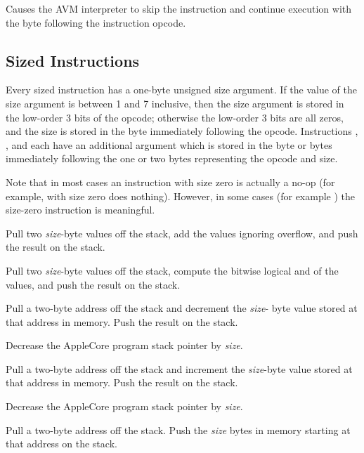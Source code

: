 \documentclass[10pt]{article}
\begin{document}
%
Causes the AVM interpreter to skip the instruction and
continue execution with the byte following the instruction
opcode.

\subsection{Sized Instructions}

Every sized instruction has a one-byte unsigned size argument.  If the
value of the size argument is between 1 and 7 inclusive, then the size
argument is stored in the low-order 3 bits of the opcode; otherwise
the low-order 3 bits are all zeros, and the size is stored in the byte
immediately following the opcode.  Instructions , ,
and  each have an additional argument which is stored in the
byte or bytes immediately following the one or two bytes representing
the opcode and size.

Note that in most cases an instruction with size zero is actually a
no-op (for example,  with size zero does nothing).  However,
in some cases (for example ) the size-zero instruction is
meaningful.

 Pull two \emph{size}-byte
values off the stack, add the values ignoring overflow, and push the
result on the stack.

 Pull two
\emph{size}-byte values off the stack, compute the bitwise logical and
of the values, and push the result on the stack.

 Pull a two-byte
address off the stack and decrement the \emph{size}- byte value stored
at that address in memory.  Push the result on the stack.

Decrease the AppleCore program stack pointer by \emph{size}.

 Pull a two-byte address
off the stack and increment the \emph{size}-byte value stored at that
address in memory.  Push the result on the stack.

Decrease the AppleCore program stack pointer by \emph{size}.

Pull a two-byte address off the stack. Push the \emph{size}
bytes in memory starting at that address on the stack.
\end{document}
